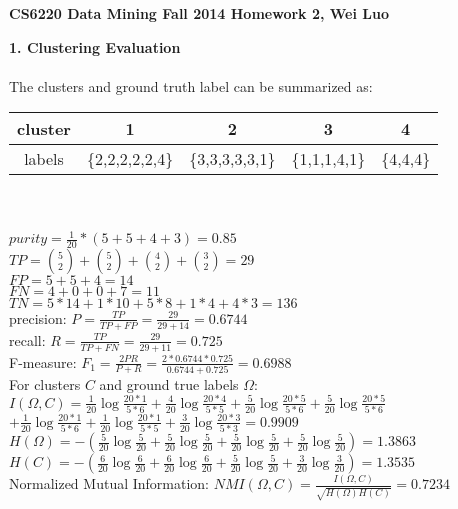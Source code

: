 \documentclass[11pt,a4paper,fleqn]{article}
\begin{document}
\begin{center}
\textbf{CS6220 Data Mining Fall 2014 Homework 2, Wei Luo}\\
\end{center}
\textbf{1. Clustering Evaluation}\\ \\
The clusters and ground truth label can be summarized as:\\
\begin{tabular}{|c|c|c|c|c|}
\hline
cluster&1&2&3&4\\
\hline
labels&\{2,2,2,2,2,4\}&\{3,3,3,3,3,1\}&\{1,1,1,4,1\}&\{4,4,4\}\\
\hline
\end{tabular}\\ \\
$purity = \frac{1}{20}*(5+5+4+3)=0.85$\\
$TP = {5 \choose 2} + {5 \choose 2} + {4 \choose 2} + {3 \choose 2} = 29$\\
$FP = 5 +5 + 4 = 14$\\
$FN = 4 + 0 + 0 + 7 = 11$\\
$TN = 5*14+1*10+5*8+1*4+4*3 = 136$\\
precision: $P = \frac{TP}{TP+FP} = \frac{29}{29+14} = 0.6744$\\
recall: $R = \frac{TP}{TP+FN} = \frac{29}{29+11} = 0.725$\\
F-measure: $F_1=\frac{2PR}{P+R} = \frac{2*0.6744*0.725}{0.6744+0.725} = 0.6988$\\
For clusters $C$ and ground true labels $\Omega$:\\
$I(\Omega,C) = \frac{1}{20}\log\frac{20*1}{5*6}+\frac{4}{20}\log\frac{20*4}{5*5}+\frac{5}{20}\log\frac{20*5}{5*6}+\frac{5}{20}\log\frac{20*5}{5*6}$\\
\indent \indent \indent $+\frac{1}{20}\log\frac{20*1}{5*6}+\frac{1}{20}\log\frac{20*1}{5*5}+\frac{3}{20}\log\frac{20*3}{5*3}=0.9909$\\
$H(\Omega) = -(\frac{5}{20}\log\frac{5}{20} +  \frac{5}{20}\log\frac{5}{20} + \frac{5}{20}\log\frac{5}{20}  + \frac{5}{20}\log\frac{5}{20}) = 1.3863$\\
$H(C) = -(\frac{6}{20}\log\frac{6}{20} +  \frac{6}{20}\log\frac{6}{20} + \frac{5}{20}\log\frac{5}{20}  + \frac{3}{20}\log\frac{3}{20}) = 1.3535$\\
Normalized Mutual Information: $NMI(\Omega,C) = \frac{I(\Omega,C)}{\sqrt{H(\Omega)H(C)}}= 0.7234$\\ \\ \\
\end{document}
